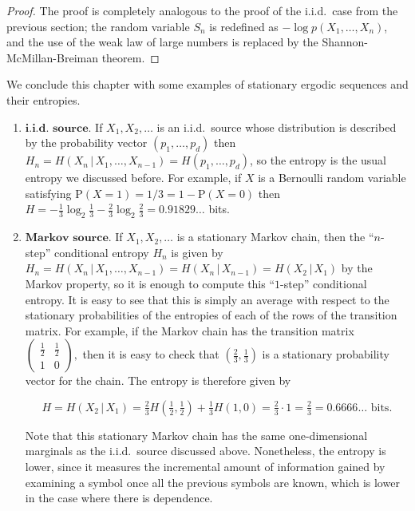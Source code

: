 \documentclass[11pt]{report}
\theoremstyle{plain}
\theoremstyle{definition}
\begin{document}
\begin{proof}
The proof is completely analogous to the proof of the
i.i.d.\ case from the previous section; the random
variable $S_n$ is redefined as
$-\log p(X_1,\ldots,X_n)$, and the use of the weak
law of large numbers is replaced by the
Shannon-McMillan-Breiman theorem.
\end{proof}

\noindent We conclude this chapter with some examples of
stationary ergodic sequences and their entropies.

\begin{enumerate}[label=\arabic*.]
\item $\textbf{i.i.d. source.}$ If $X_1,X_2,\ldots$ is an
i.i.d.\ source whose distribution is described by the
probability vector $(p_1,\ldots,p_d)$ then
$H_n=H(X_n\,|\,X_1,\ldots,X_{n-1})=H(p_1,\ldots,p_d)$,
so the entropy is the usual entropy we discussed
before. For example, if $X$ is a Bernoulli random
variable satisfying
$\mathrm{P}(X=1)=1/3=1-\mathrm{P}(X=0)$ then
$H=-\tfrac13 \log_2 \tfrac13 - \tfrac23 \log_2
\tfrac23 = 0.91829\ldots$
bits.

\item $\textbf{Markov source.}$ If $X_1,X_2,\ldots$ is a
stationary Markov chain, then the ``$n$-step''
conditional entropy $H_n$ is given by
$H_n=H(X_n\,|\,X_1,\ldots,X_{n-1})=
H(X_n\,|\,X_{n-1}) = H(X_2\,|\,X_1)$
by the Markov property, so it is enough to compute
this ``$1$-step'' conditional entropy. It is easy to
see that this is simply an average with respect to the
stationary probabilities of the entropies of each of
the rows of the transition matrix. For example, if the
Markov chain has the transition matrix
$\left( \begin{array}{cc} \tfrac12 & \tfrac12 \\ 1&0
\end{array} \right),$
then it is easy to check that $(\tfrac23,\tfrac13)$
is a stationary probability vector for the chain. The
entropy is therefore given by

\[
H = H(X_2\,|\,X_1) = \tfrac23 H(\tfrac12,\tfrac12) + \tfrac13 H(1,0) = \tfrac23 \cdot 1 = \tfrac 23 = 0.6666\ldots \textrm{ bits}.
\]

\noindent Note that this stationary Markov chain has the same
one-dimensional marginals as the i.i.d.\ source
discussed above. Nonetheless, the entropy is lower,
since it measures the incremental amount of
information gained by examining a symbol once all the
previous symbols are known, which is lower in the case
where there is dependence.


\end{enumerate}
\end{document}
